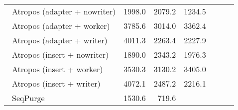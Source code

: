 \begin{table}[ht]
\begin{tabular}{lr|rr|rr|r}
            \\\            Atropos (adapter + nowriter) &
            
            1998.0 &
            
            
            2079.2 &
            
            
            1234.5 &
            
            \\\            Atropos (adapter + worker) &
            
            3785.6 &
            
            
            3014.0 &
            
            
            3362.4 &
            
            \\\            Atropos (adapter + writer) &
            
            4011.3 &
            
            
            2263.4 &
            
            
            2227.9 &
            
            \\\            Atropos (insert + nowriter) &
            
            1890.0 &
            
            
            2343.2 &
            
            
            1976.3 &
            
            \\\            Atropos (insert + worker) &
            
            3530.3 &
            
            
            3130.2 &
            
            
            3405.0 &
            
            \\\            Atropos (insert + writer) &
            
            4072.1 &
            
            
            2487.2 &
            
            
            2216.1 &
            
            \\\            SeqPurge &
            
            1530.6 &
            
            
            719.6 &
            

\end{tabular}
\end{table}
